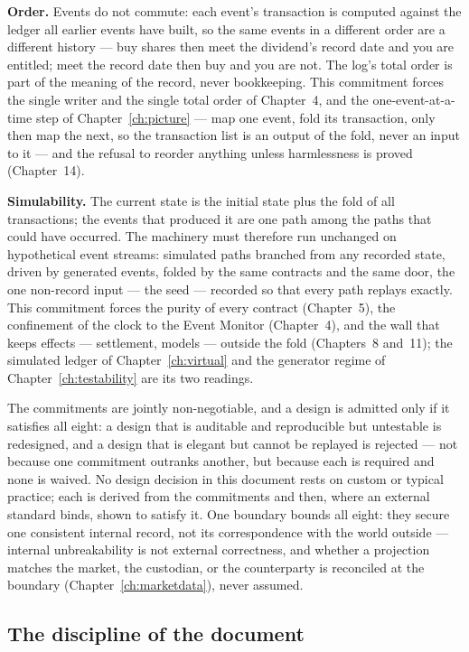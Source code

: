 \textbf{Order.} Events do not commute: each event's transaction is computed against the
ledger all earlier events have built, so the same events in a different order are a
different history --- buy shares then meet the dividend's record date and you are
entitled; meet the record date then buy and you are not. The log's total order is part
of the meaning of the record, never bookkeeping. This commitment forces the single
writer and the single total order of Chapter~4, and the one-event-at-a-time step of
Chapter~\ref{ch:picture} --- map one event, fold its transaction, only then map the
next, so the transaction list is an output of the fold, never an input to it --- and
the refusal to reorder anything unless harmlessness is proved (Chapter~14).

\textbf{Simulability.} The current state is the initial state plus the fold of all
transactions; the events that produced it are one path among the paths that could have
occurred. The machinery must therefore run unchanged on hypothetical event streams:
simulated paths branched from any recorded state, driven by generated events, folded by
the same contracts and the same door, the one non-record input --- the seed --- recorded
so that every path replays exactly. This commitment forces the purity of every contract
(Chapter~5), the confinement of the clock to the Event Monitor (Chapter~4), and the wall
that keeps effects --- settlement, models --- outside the fold (Chapters~8 and~11); the
simulated ledger of Chapter~\ref{ch:virtual} and the generator regime of
Chapter~\ref{ch:testability} are its two readings.

The commitments are jointly non-negotiable, and a design is admitted only if it
satisfies all eight: a design that is auditable and reproducible but untestable is
redesigned, and a design that is elegant but cannot be replayed is rejected --- not
because one commitment outranks another, but because each is required and none is
waived. No design decision in this document rests on custom or typical
practice; each is derived from the commitments and then, where an external standard
binds, shown to satisfy it. One boundary bounds all eight: they secure one consistent
internal record, not its correspondence with the world outside --- internal
unbreakability is not external correctness, and whether a projection matches the market,
the custodian, or the counterparty is reconciled at the boundary
(Chapter~\ref{ch:marketdata}), never assumed.

\subsection{The discipline of the document}

